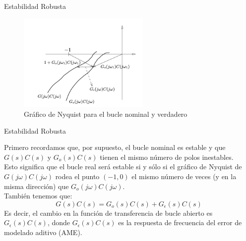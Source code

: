 \documentclass{beamer}
\begin{document}
\begin{frame}{Estabilidad Robusta}
\begin{justify}
\begin{itemize}
\begin{figure}[H]
    \centering
    \includegraphics[width=2.5in]{imagenes/nyquist-nominal-true.png}
    \caption{Gráfico de Nyquist para el bucle nominal y verdadero}
    \label{niquist-function}
    \end{figure}
\end{itemize}
\end{justify}
\end{frame}

\begin{frame}{Estabilidad Robusta}
\begin{justify}

\begin{itemize}
\justifying
Primero recordamos que, por supuesto, el bucle nominal es estable y que $G(s)C(s)$ y $G_o(s)C(s)$ tienen el mismo número de polos inestables.
\\
Esto significa que el bucle real será estable si y sólo si el gráfico de Nyquist de $G(j\omega)C(j\omega)$ rodea el punto $(−1, 0)$ el mismo número de veces (y en la misma dirección) que $G_o(j\omega)C(j\omega)$.
\\
También tenemos que:
 \begin{equation}\label{sensibilidad3}
   G(s)C(s)=G_o(s)C(s)+G_\epsilon (s)C(s)
\end{equation}
Es decir, el cambio en la función de transferencia de bucle abierto es $G_{\epsilon}(s)C(s)$, donde $G_{\epsilon}(s)C(s)$ es la respuesta de frecuencia del error de modelado aditivo (AME).
\end{itemize}
\end{justify}
\end{frame}
\end{document}
